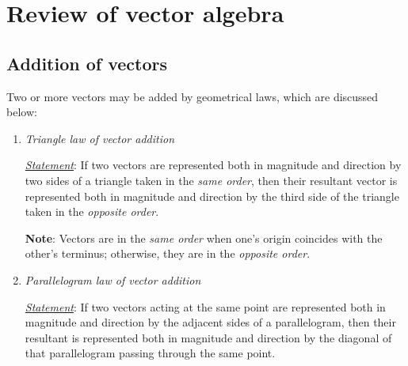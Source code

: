 \section{Review of vector algebra}

	\subsection{Addition of vectors}
		Two or more vectors may be added by geometrical laws, which are discussed below:
		
		\begin{enumerate}
			\item \textit{Triangle law of vector addition}
			
			\textit{\ul{Statement}}: If two vectors are represented both in magnitude and direction by two sides of a triangle taken in the \textit{same order}, then their resultant vector is represented both in magnitude and direction by the third side of the triangle taken in the \textit{opposite order}.
			
			\textbf{Note}: Vectors are in the \textit{same order} when one's origin coincides with the other's terminus; otherwise, they are in the \textit{opposite order}.
			
%					
%					
			
			\item \textit{Parallelogram law of vector addition}
			
			\textit{\ul{Statement}}: If two vectors acting at the same point are represented both in magnitude and direction by the adjacent sides of a parallelogram, then their resultant is represented both in magnitude and direction by the diagonal of that parallelogram passing through the same point.
			

\end{enumerate}
